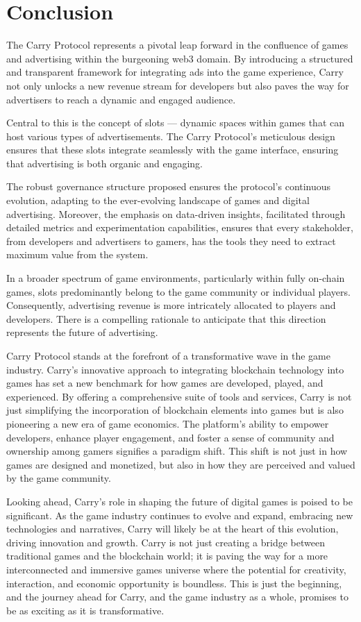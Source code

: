 \section{Conclusion}

The Carry Protocol represents a pivotal leap forward in the confluence of games and advertising within the burgeoning web3 domain. By introducing a structured and transparent framework for integrating ads into the game experience, Carry not only unlocks a new revenue stream for developers but also paves the way for advertisers to reach a dynamic and engaged audience.

Central to this is the concept of slots — dynamic spaces within games that can host various types of advertisements. The Carry Protocol's meticulous design ensures that these slots integrate seamlessly with the game interface, ensuring that advertising is both organic and engaging.

The robust governance structure proposed ensures the protocol's continuous evolution, adapting to the ever-evolving landscape of games and digital advertising. Moreover, the emphasis on data-driven insights, facilitated through detailed metrics and experimentation capabilities, ensures that every stakeholder, from developers and advertisers to gamers, has the tools they need to extract maximum value from the system.

In a broader spectrum of game environments, particularly within fully on-chain games, slots predominantly belong to the game community or individual players. Consequently, advertising revenue is more intricately allocated to players and developers. There is a compelling rationale to anticipate that this direction represents the future of advertising.

Carry Protocol stands at the forefront of a transformative wave in the game industry. Carry's innovative approach to integrating blockchain technology into games has set a new benchmark for how games are developed, played, and experienced. By offering a comprehensive suite of tools and services, Carry is not just simplifying the incorporation of blockchain elements into games but is also pioneering a new era of game economics. The platform's ability to empower developers, enhance player engagement, and foster a sense of community and ownership among gamers signifies a paradigm shift. This shift is not just in how games are designed and monetized, but also in how they are perceived and valued by the game community.

Looking ahead, Carry's role in shaping the future of digital games is poised to be significant. As the game industry continues to evolve and expand, embracing new technologies and narratives, Carry will likely be at the heart of this evolution, driving innovation and growth. Carry is not just creating a bridge between traditional games and the blockchain world; it is paving the way for a more interconnected and immersive games universe where the potential for creativity, interaction, and economic opportunity is boundless. This is just the beginning, and the journey ahead for Carry, and the game industry as a whole, promises to be as exciting as it is transformative.